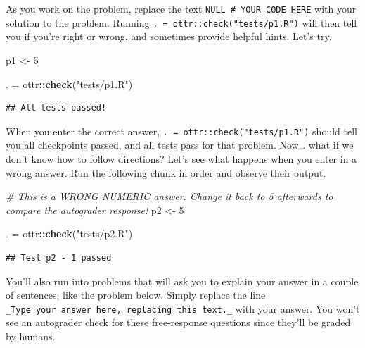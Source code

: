 \documentclass[
]{article}
\newenvironment{Shaded}{\begin{snugshade}}{\end{snugshade}}
\newcommand{\CommentTok}[1]{\textcolor[rgb]{0.56,0.35,0.01}{\textit{#1}}}
\newcommand{\DecValTok}[1]{\textcolor[rgb]{0.00,0.00,0.81}{#1}}
\newcommand{\FunctionTok}[1]{\textcolor[rgb]{0.13,0.29,0.53}{\textbf{#1}}}
\newcommand{\NormalTok}[1]{#1}
\newcommand{\OtherTok}[1]{\textcolor[rgb]{0.56,0.35,0.01}{#1}}
\newcommand{\SpecialCharTok}[1]{\textcolor[rgb]{0.81,0.36,0.00}{\textbf{#1}}}
\newcommand{\StringTok}[1]{\textcolor[rgb]{0.31,0.60,0.02}{#1}}
\begin{document}
As you work on the problem, replace the text
\texttt{NULL\ \#\ YOUR\ CODE\ HERE} with your solution to the problem.
Running \texttt{.\ =\ ottr::check("tests/p1.R")} will then tell you if
you're right or wrong, and sometimes provide helpful hints. Let's try.

\begin{Shaded}
\begin{Highlighting}[]
\NormalTok{p1 }\OtherTok{\textless{}{-}} \DecValTok{5}
\end{Highlighting}
\end{Shaded}

\begin{Shaded}
\begin{Highlighting}[]
\NormalTok{. }\OtherTok{=}\NormalTok{ ottr}\SpecialCharTok{::}\FunctionTok{check}\NormalTok{(}\StringTok{"tests/p1.R"}\NormalTok{)}
\end{Highlighting}
\end{Shaded}

\begin{verbatim}
## All tests passed!
\end{verbatim}

When you enter the correct answer,
\texttt{.\ =\ ottr::check("tests/p1.R")} should tell you all checkpoints
passed, and all tests pass for that problem. Now\ldots{} what if we
don't know how to follow directions? Let's see what happens when you
enter in a wrong answer. Run the following chunk in order and observe
their output.

\begin{Shaded}
\begin{Highlighting}[]
\CommentTok{\# This is a WRONG NUMERIC answer. Change it back to 5 afterwards to compare the autograder response!}
\NormalTok{p2 }\OtherTok{\textless{}{-}} \DecValTok{5}
\end{Highlighting}
\end{Shaded}

\begin{Shaded}
\begin{Highlighting}[]
\NormalTok{. }\OtherTok{=}\NormalTok{ ottr}\SpecialCharTok{::}\FunctionTok{check}\NormalTok{(}\StringTok{"tests/p2.R"}\NormalTok{)}
\end{Highlighting}
\end{Shaded}

\begin{verbatim}
## Test p2 - 1 passed
\end{verbatim}

You'll also run into problems that will ask you to explain your answer
in a couple of sentences, like the problem below. Simply replace the
line \texttt{\_Type\ your\ answer\ here,\ replacing\ this\ text.\_} with
your answer. You won't see an autograder check for these free-response
questions since they'll be graded by humans.
\end{document}
